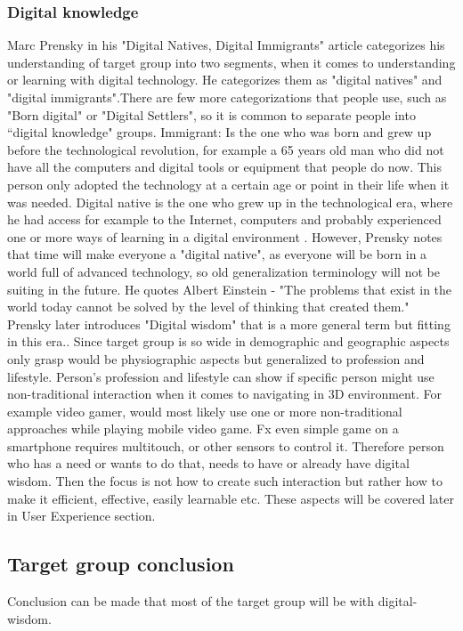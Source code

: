 \subsubsection{Digital knowledge}
Marc Prensky in his "Digital Natives, Digital Immigrants" \cite{DigitalImmigrants} article categorizes his understanding of target group into two segments, when it comes to understanding or learning with digital technology. He categorizes them as "digital natives" and "digital immigrants".There are few more categorizations that people use, such as "Born digital" or "Digital Settlers", so it is common to separate people into “digital knowledge" groups. Immigrant: Is the one who was born and grew up before the technological revolution, for example a 65 years old man who did not have all the computers and digital tools or equipment that people do now. This person only adopted the technology at a certain age or point in their life when it was needed. Digital native is the one who grew up in the technological era, where he had access for example to the Internet, computers and probably experienced one or more ways of learning in a digital environment \cite{DigitalImmigrants}. However, Prensky notes that time will make everyone a "digital native", as everyone will be born in a world full of advanced technology, so old generalization terminology will not be suiting in the future. He quotes Albert Einstein - "The problems that exist in the world today cannot be solved by the level of thinking that created them." Prensky later introduces "Digital wisdom" that is a more general term but fitting in this era.\cite{DigitalWisdom}. Since target group is so wide in demographic and geographic aspects only grasp would be physiographic aspects but generalized to profession and lifestyle. Person's profession and lifestyle can show if specific person might use non-traditional interaction when it comes to navigating in 3D environment. For example video gamer, would most likely use one or more non-traditional approaches while playing mobile video game. Fx even simple game on a smartphone requires multitouch, or other sensors to control it. 
Therefore person who has a need or wants to do that, needs to have or already have digital wisdom. Then the focus is not how to create such interaction but rather how to make it efficient, effective, easily learnable etc. These aspects will be covered later in User Experience section.

\subsection{Target group conclusion}
Conclusion can be made that most of the target group will be with digital-wisdom.